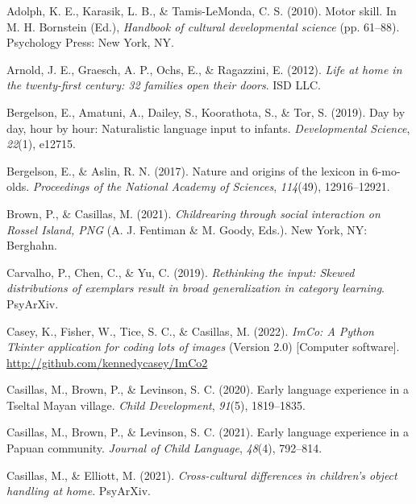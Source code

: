 \documentclass[10pt, letterpaper]{article}
\newenvironment{CSLReferences}%
  {}%
  {\par}
\begin{document}
\hypertarget{refs}{}
\begin{CSLReferences}{1}{0}
\leavevmode\hypertarget{ref-adolph2010motor}{}%
Adolph, K. E., Karasik, L. B., \& Tamis-LeMonda, C. S. (2010). Motor
skill. In M. H. Bornstein (Ed.), \emph{Handbook of cultural
developmental science} (pp. 61--88). Psychology Press: New York, NY.

\leavevmode\hypertarget{ref-arnold2012life}{}%
Arnold, J. E., Graesch, A. P., Ochs, E., \& Ragazzini, E. (2012).
\emph{Life at home in the twenty-first century: 32 families open their
doors}. ISD LLC.

\leavevmode\hypertarget{ref-bergelson2019day}{}%
Bergelson, E., Amatuni, A., Dailey, S., Koorathota, S., \& Tor, S.
(2019). Day by day, hour by hour: Naturalistic language input to
infants. \emph{Developmental Science}, \emph{22}(1), e12715.

\leavevmode\hypertarget{ref-bergelson2017nature}{}%
Bergelson, E., \& Aslin, R. N. (2017). Nature and origins of the lexicon
in 6-mo-olds. \emph{Proceedings of the National Academy of Sciences},
\emph{114}(49), 12916--12921.

\leavevmode\hypertarget{ref-brownIPchildrearing}{}%
Brown, P., \& Casillas, M. (2021). \emph{Childrearing through social
interaction on {Rossel Island, PNG}} (A. J. Fentiman \& M. Goody, Eds.).
New York, NY: Berghahn.

\leavevmode\hypertarget{ref-carvalho2019rethinking}{}%
Carvalho, P., Chen, C., \& Yu, C. (2019). \emph{Rethinking the input:
Skewed distributions of exemplars result in broad generalization in
category learning}. PsyArXiv.

\leavevmode\hypertarget{ref-casey2022imco}{}%
Casey, K., Fisher, W., Tice, S. C., \& Casillas, M. (2022). \emph{ImCo:
A {Python Tkinter} application for coding lots of images} (Version 2.0)
{[}Computer software{]}. \url{http://github.com/kennedycasey/ImCo2}

\leavevmode\hypertarget{ref-casillas2020early}{}%
Casillas, M., Brown, P., \& Levinson, S. C. (2020). Early language
experience in a {Tseltal Mayan} village. \emph{Child Development},
\emph{91}(5), 1819--1835.

\leavevmode\hypertarget{ref-casillas2021early}{}%
Casillas, M., Brown, P., \& Levinson, S. C. (2021). Early language
experience in a {Papuan} community. \emph{Journal of Child Language},
\emph{48}(4), 792--814.

\leavevmode\hypertarget{ref-casillasURdaylong}{}%
Casillas, M., \& Elliott, M. (2021). \emph{Cross-cultural differences in
children's object handling at home}. PsyArXiv.


\end{CSLReferences}
\end{document}

